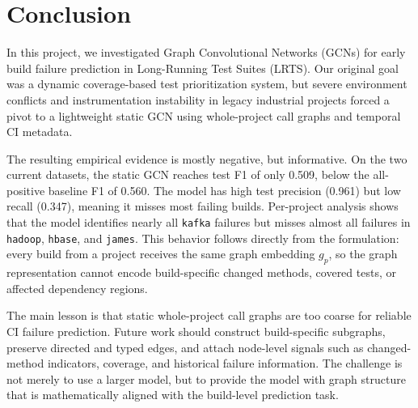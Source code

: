 \section{Conclusion}

In this project, we investigated Graph Convolutional Networks (GCNs) for early build failure prediction in Long-Running Test Suites (LRTS). Our original goal was a dynamic coverage-based test prioritization system, but severe environment conflicts and instrumentation instability in legacy industrial projects forced a pivot to a lightweight static GCN using whole-project call graphs and temporal CI metadata.

The resulting empirical evidence is mostly negative, but informative. On the two current datasets, the static GCN reaches test F1 of only 0.509, below the all-positive baseline F1 of 0.560. The model has high test precision (0.961) but low recall (0.347), meaning it misses most failing builds. Per-project analysis shows that the model identifies nearly all \texttt{kafka} failures but misses almost all failures in \texttt{hadoop}, \texttt{hbase}, and \texttt{james}. This behavior follows directly from the formulation: every build from a project receives the same graph embedding $g_p$, so the graph representation cannot encode build-specific changed methods, covered tests, or affected dependency regions.

The main lesson is that static whole-project call graphs are too coarse for reliable CI failure prediction. Future work should construct build-specific subgraphs, preserve directed and typed edges, and attach node-level signals such as changed-method indicators, coverage, and historical failure information. The challenge is not merely to use a larger model, but to provide the model with graph structure that is mathematically aligned with the build-level prediction task.
